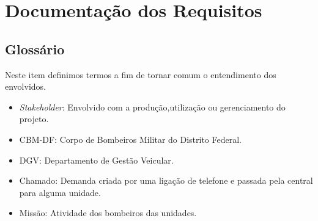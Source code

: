	\section{Documentação dos Requisitos}
		\subsection{Glossário}
Neste item definimos termos a fim de tornar comum o entendimento dos envolvidos.
\begin{itemize}
 \item \textit{Stakeholder}: Envolvido com a produção,utilização ou gerenciamento do projeto.
 \item CBM-DF: Corpo de Bombeiros Militar do Distrito Federal.
 \item DGV: Departamento de Gestão Veicular.
 \item Chamado: Demanda criada por uma ligação de telefone e passada pela central para alguma unidade.
 \item Missão: Atividade dos bombeiros das unidades.
\end{itemize}